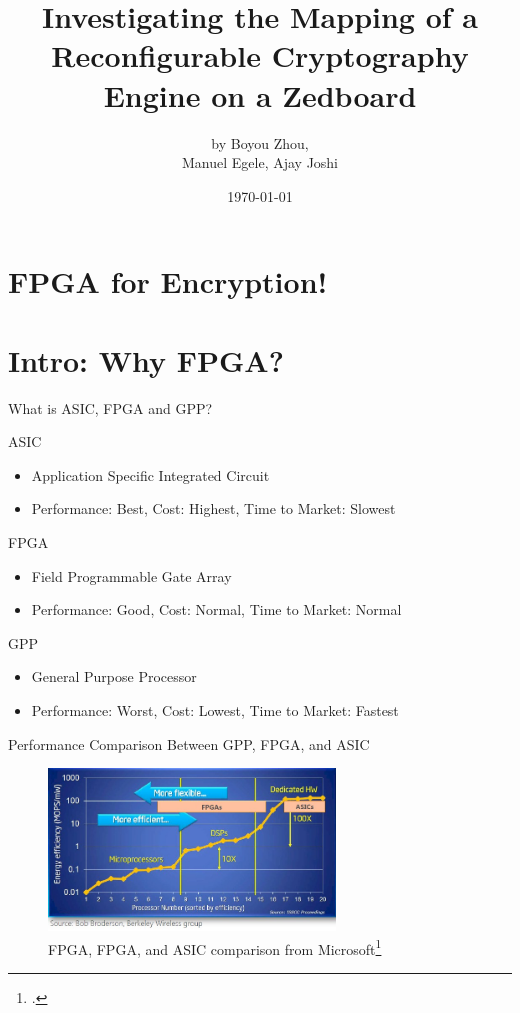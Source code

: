 \documentclass[t]{beamer}
\title[FPGA for ENC!]{Investigating the Mapping of a Reconfigurable Cryptography Engine on a Zedboard}
\author[bobzhou@bu.edu]{by Boyou Zhou,\\Manuel Egele, Ajay Joshi}
\date[\today]{\today}
\begin{document}
\maketitle

\section*{FPGA for Encryption!}

\section{Intro: Why FPGA?}

\begin{frame}{What is ASIC, FPGA and GPP?}
    \begin{block}{ASIC}
        \begin{itemize}
            \item Application Specific Integrated Circuit
            \item Performance: Best, Cost: Highest, Time to Market: Slowest
        \end{itemize}
    \end{block}
    \begin{block}{FPGA}
        \begin{itemize}
            \item Field Programmable Gate Array
            \item Performance: Good, Cost: Normal, Time to Market: Normal 
        \end{itemize}
    \end{block}
    \begin{block}{GPP}
       \begin{itemize}
            \item General Purpose Processor
            \item Performance: Worst, Cost: Lowest, Time to Market: Fastest
       \end{itemize} 
    \end{block}
\end{frame}

\begin{frame}{Performance Comparison Between GPP, FPGA, and ASIC}
    \begin{figure}
        \includegraphics[width=3in]{img/microsoft-fpga-vs-cpu-vs-asic.png}
        \caption{FPGA, FPGA, and ASIC comparison from Microsoft\footcite{http://www.theplatform.net/2015/03/30/why-intel-might-buy-fpga-maker-altera}}
        \label{fig:performance-comparison}
    \end{figure}
\end{frame}
\end{document}

